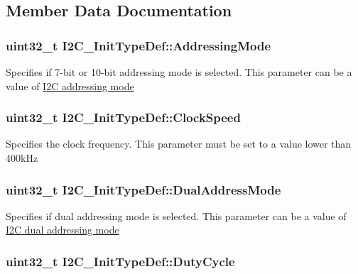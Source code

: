 \subsection{Member Data Documentation}
\hypertarget{struct_i2_c___init_type_def_a5c39c41a5ee892c1bce69a579cc017ca}{
\subsubsection[{Addressing\-Mode}]{\setlength{\rightskip}{0pt plus 5cm}uint32\-\_\-t I2\-C\-\_\-\-Init\-Type\-Def\-::\-Addressing\-Mode}}\label{struct_i2_c___init_type_def_a5c39c41a5ee892c1bce69a579cc017ca}
Specifies if 7-\/bit or 10-\/bit addressing mode is selected. This parameter can be a value of \hyperlink{group___i2_c__addressing__mode}{I2\-C addressing mode} \hypertarget{struct_i2_c___init_type_def_a45f1209e7e43e55f055bd9ead064230a}{
\subsubsection[{Clock\-Speed}]{\setlength{\rightskip}{0pt plus 5cm}uint32\-\_\-t I2\-C\-\_\-\-Init\-Type\-Def\-::\-Clock\-Speed}}\label{struct_i2_c___init_type_def_a45f1209e7e43e55f055bd9ead064230a}
Specifies the clock frequency. This parameter must be set to a value lower than 400k\-Hz \hypertarget{struct_i2_c___init_type_def_add6a6b87ee067d33c94c554288736d40}{
\subsubsection[{Dual\-Address\-Mode}]{\setlength{\rightskip}{0pt plus 5cm}uint32\-\_\-t I2\-C\-\_\-\-Init\-Type\-Def\-::\-Dual\-Address\-Mode}}\label{struct_i2_c___init_type_def_add6a6b87ee067d33c94c554288736d40}
Specifies if dual addressing mode is selected. This parameter can be a value of \hyperlink{group___i2_c__dual__addressing__mode}{I2\-C dual addressing mode} \hypertarget{struct_i2_c___init_type_def_a91eb2f998ac771478ec0f44ac73c32dd}{
\subsubsection[{Duty\-Cycle}]{\setlength{\rightskip}{0pt plus 5cm}uint32\-\_\-t I2\-C\-\_\-\-Init\-Type\-Def\-::\-Duty\-Cycle}}\label{struct_i2_c___init_type_def_a91eb2f998ac771478ec0f44ac73c32dd}
